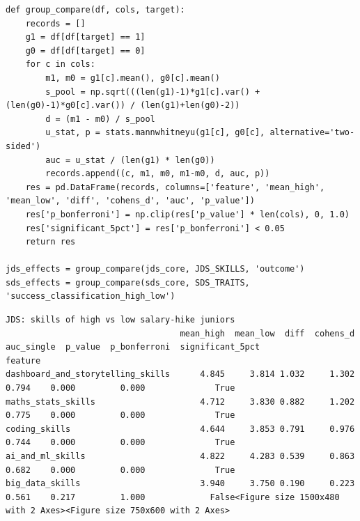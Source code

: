 \documentclass[conference]{IEEEtran}
\begin{document}
\begin{lstlisting}[style=pythonstyle,caption={High-versus-low cohort comparisons with Bonferroni multiple testing corrections.},label={lst:effects_code}]
def group_compare(df, cols, target):
    records = []
    g1 = df[df[target] == 1]
    g0 = df[df[target] == 0]
    for c in cols:
        m1, m0 = g1[c].mean(), g0[c].mean()
        s_pool = np.sqrt(((len(g1)-1)*g1[c].var() + (len(g0)-1)*g0[c].var()) / (len(g1)+len(g0)-2))
        d = (m1 - m0) / s_pool
        u_stat, p = stats.mannwhitneyu(g1[c], g0[c], alternative='two-sided')
        auc = u_stat / (len(g1) * len(g0))
        records.append((c, m1, m0, m1-m0, d, auc, p))
    res = pd.DataFrame(records, columns=['feature', 'mean_high', 'mean_low', 'diff', 'cohens_d', 'auc', 'p_value'])
    res['p_bonferroni'] = np.clip(res['p_value'] * len(cols), 0, 1.0)
    res['significant_5pct'] = res['p_bonferroni'] < 0.05
    return res

jds_effects = group_compare(jds_core, JDS_SKILLS, 'outcome')
sds_effects = group_compare(sds_core, SDS_TRAITS, 'success_classification_high_low')
\end{lstlisting}

\begin{lstlisting}[style=outputstyle,caption={Execution Output G.8a: Junior Skills Group Differences (Table III).},label={out:jds_effects}]
JDS: skills of high vs low salary-hike juniors
                                   mean_high  mean_low  diff  cohens_d  auc_single  p_value  p_bonferroni  significant_5pct
feature                                                                                                                    
dashboard_and_storytelling_skills      4.845     3.814 1.032     1.302       0.794    0.000         0.000              True
maths_stats_skills                     4.712     3.830 0.882     1.202       0.775    0.000         0.000              True
coding_skills                          4.644     3.853 0.791     0.976       0.744    0.000         0.000              True
ai_and_ml_skills                       4.822     4.283 0.539     0.863       0.682    0.000         0.000              True
big_data_skills                        3.940     3.750 0.190     0.223       0.561    0.217         1.000             False<Figure size 1500x480 with 2 Axes><Figure size 750x600 with 2 Axes>
\end{lstlisting}
\end{document}
